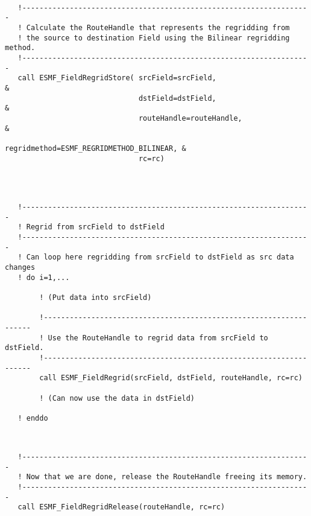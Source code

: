 
 \begin{verbatim}

   !-------------------------------------------------------------------
   ! Calculate the RouteHandle that represents the regridding from 
   ! the source to destination Field using the Bilinear regridding method.
   !-------------------------------------------------------------------
   call ESMF_FieldRegridStore( srcField=srcField,                       &
                               dstField=dstField,                       &
                               routeHandle=routeHandle,                 &
                               regridmethod=ESMF_REGRIDMETHOD_BILINEAR, &
                               rc=rc)
 
\end{verbatim}
 

 \begin{verbatim}


   !-------------------------------------------------------------------
   ! Regrid from srcField to dstField
   !-------------------------------------------------------------------
   ! Can loop here regridding from srcField to dstField as src data changes
   ! do i=1,...

        ! (Put data into srcField)

        !-------------------------------------------------------------------
        ! Use the RouteHandle to regrid data from srcField to dstField.
        !-------------------------------------------------------------------
        call ESMF_FieldRegrid(srcField, dstField, routeHandle, rc=rc)

        ! (Can now use the data in dstField)

   ! enddo

 
\end{verbatim}
 

 \begin{verbatim}
   !-------------------------------------------------------------------
   ! Now that we are done, release the RouteHandle freeing its memory. 
   !-------------------------------------------------------------------
   call ESMF_FieldRegridRelease(routeHandle, rc=rc)
 
\end{verbatim}

\setlength{\parskip}{\oldparskip}
\setlength{\parindent}{\oldparindent}
\setlength{\baselineskip}{\oldbaselineskip}
